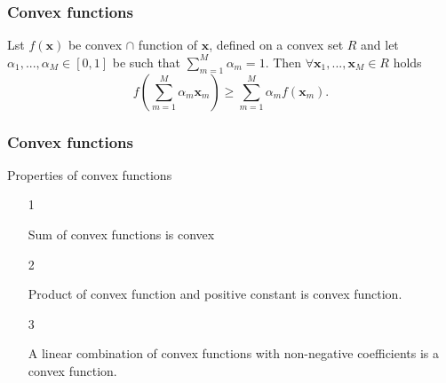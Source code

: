 \documentclass[14pt]{beamer}
\renewcommand{\vec}[1]{\ensuremath{\boldsymbol{#1}}}
\begin{document}
\begin{frame}
\frametitle{Convex functions}
\begin{itemize}

    \begin{theorem}
    \label{th_convex}
    Lst $f(\vec x)$ be convex $ \cap $ function of $\vec x$, defined on a convex set $R$ and let $\alpha _1 ,...,\alpha _M \in [0,1]$ be such that
    $\sum\limits_{m = 1}^M {\alpha _m } = 1$. 
    Then $\forall \vec x_1 ,...,\vec x_M \in R$ holds
    \begin{equation}
    \label{eq5} f\left( \sum\limits_{m = 1}^M \alpha _m \vec x_m
    \right) \ge \sum\limits_{m = 1}^M \alpha _m f(\vec x_m ).
    \end{equation}
    \end{theorem}
 
 
 
\end{itemize}
\end{frame}



\begin{frame}
\frametitle{Convex functions}
Properties of convex functions
\begin{itemize}

    \item[1]
    \begin{prop} 
    Sum of convex functions is convex
    \end{prop}
    
    \item[2]
    \begin{prop} Product of convex function and positive constant is convex function.
    \end{prop}
    
    \item[3]
    \begin{prop}
    \label{lincomb} A linear combination of convex functions with non-negative coefficients is a convex function.
    \end{prop}
        
\end{itemize}
\end{frame}
\end{document}
